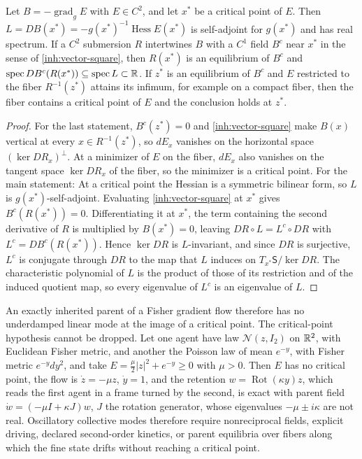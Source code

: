 Let $B=-\operatorname{grad}_gE$ with $E\in C^2$, and let $x^*$ be a critical
point of $E$. Then $L=DB(x^*)=-g(x^*)^{-1}\operatorname{Hess}E(x^*)$ is
self-adjoint for $g(x^*)$ and has real spectrum. If a $C^2$ submersion $R$
intertwines $B$ with a $C^1$ field $B^c$ near $x^*$ in the sense of
\cref{inh:vector-square}, then $R(x^*)$ is an equilibrium of $B^c$ and
$\operatorname{spec}DB^c(R(x^*))\subseteq\operatorname{spec}L\subset\mathbb R$.
If $z^*$ is an equilibrium of $B^c$ and $E$ restricted to the fiber
$R^{-1}(z^*)$ attains its infimum, for example on a compact fiber, then the
fiber contains a critical point of $E$ and the conclusion holds at $z^*$.
\begin{proof}
For the last statement, $B^c(z^*)=0$ and \cref{inh:vector-square} make
$B(x)$ vertical at every $x\in R^{-1}(z^*)$, so $dE_x$ vanishes on the
horizontal space $(\ker DR_x)^\perp$. At a minimizer of $E$ on the fiber,
$dE_x$ also vanishes on the tangent space $\ker DR_x$ of the fiber, so the
minimizer is a critical point. For the main statement:
At a critical point the Hessian is a symmetric bilinear form, so $L$ is
$g(x^*)$-self-adjoint. Evaluating \cref{inh:vector-square} at $x^*$ gives
$B^c(R(x^*))=0$. Differentiating it at $x^*$, the term containing the second
derivative of $R$ is multiplied by $B(x^*)=0$, leaving
$DR\circ L=L^c\circ DR$ with $L^c=DB^c(R(x^*))$. Hence $\ker DR$ is $L$-invariant,
and since $DR$ is surjective, $L^c$ is conjugate through $DR$ to the map that
$L$ induces on $T_{x^*}\mathsf S/\ker DR$. The characteristic polynomial of
$L$ is the product of those of its restriction and of the induced quotient
map, so every eigenvalue of $L^c$ is an eigenvalue of $L$.
\end{proof}

An exactly inherited parent of a Fisher gradient flow therefore has no
underdamped linear mode at the image of a critical point. The critical-point
hypothesis cannot be dropped. Let one agent have law $\mathcal N(z,I_2)$ on
$\mathbb R^2$, with Euclidean Fisher metric, and another the Poisson law of mean
$e^{-y}$, with Fisher metric $e^{-y}dy^2$, and take
$E=\tfrac\mu2|z|^2+e^{-y}\geq0$ with $\mu>0$. Then $E$ has no critical
point, the flow is $\dot z=-\mu z$, $\dot y=1$, and the retention
$w=\operatorname{Rot}(\kappa y)z$, which reads the first agent in a frame
turned by the second, is exact with parent field
$\dot w=(-\mu I+\kappa J)w$, $J$ the rotation generator, whose eigenvalues
$-\mu\pm i\kappa$ are not real. Oscillatory collective modes therefore
require nonreciprocal fields, explicit driving, declared second-order
kinetics, or parent equilibria over fibers along which the fine state
drifts without reaching a critical point.

